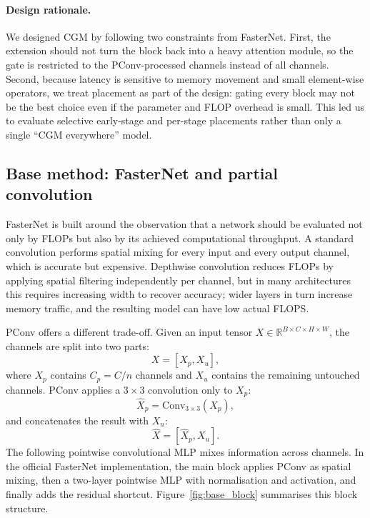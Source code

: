 \documentclass{article}
\begin{document}
\paragraph{Design rationale.} We designed CGM by following two constraints from FasterNet. First, the extension should not turn the block back into a heavy attention module, so the gate is restricted to the PConv-processed channels instead of all channels. Second, because latency is sensitive to memory movement and small element-wise operators, we treat placement as part of the design: gating every block may not be the best choice even if the parameter and FLOP overhead is small. This led us to evaluate selective early-stage and per-stage placements rather than only a single ``CGM everywhere'' model.

\subsection{Base method: FasterNet and partial convolution}

FasterNet \citep{chen2023fasternet} is built around the observation that a network should be evaluated not only by FLOPs but also by its achieved computational throughput. A standard convolution performs spatial mixing for every input and every output channel, which is accurate but expensive. Depthwise convolution reduces FLOPs by applying spatial filtering independently per channel, but in many architectures this requires increasing width to recover accuracy; wider layers in turn increase memory traffic, and the resulting model can have low actual FLOPS.

PConv offers a different trade-off. Given an input tensor $X \in \mathbb{R}^{B \times C \times H \times W}$, the channels are split into two parts:
\begin{equation}
X = [X_p, X_u],
\end{equation}
where $X_p$ contains $C_p = C / n$ channels and $X_u$ contains the remaining untouched channels. PConv applies a $3 \times 3$ convolution only to $X_p$:
\begin{equation}
\hat{X}_p = \mathrm{Conv}_{3 \times 3}(X_p),
\end{equation}
and concatenates the result with $X_u$:
\begin{equation}
\hat{X} = [\hat{X}_p, X_u].
\end{equation}
The following pointwise convolutional MLP mixes information across channels. In the official FasterNet implementation, the main block applies PConv as spatial mixing, then a two-layer pointwise MLP with normalisation and activation, and finally adds the residual shortcut. Figure~\ref{fig:base_block} summarises this block structure.
\end{document}

